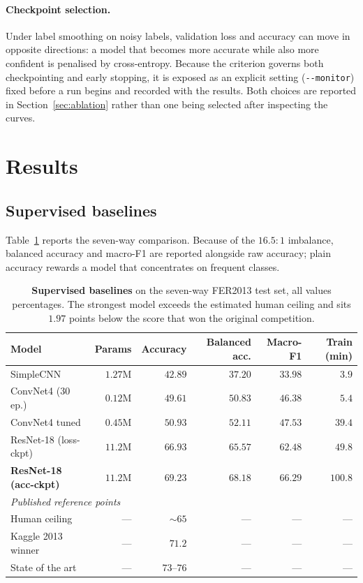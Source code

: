 \documentclass[11pt,a4paper]{article}
\begin{document}
\paragraph{Checkpoint selection.}
Under label smoothing on noisy labels, validation loss and accuracy can move in
opposite directions: a model that becomes more accurate while also more
confident is penalised by cross-entropy. Because the criterion governs both
checkpointing and early stopping, it is exposed as an explicit setting
(\texttt{-{}-monitor}) fixed before a run begins and recorded with the results.
Both choices are reported in Section~\ref{sec:ablation} rather than one being
selected after inspecting the curves.

\section{Results}
\label{sec:results}

\subsection{Supervised baselines}
Table~\ref{tab:baselines} reports the seven-way comparison. Because of the
$16.5{:}1$ imbalance, balanced accuracy and macro-F1 are reported alongside raw
accuracy; plain accuracy rewards a model that concentrates on frequent classes.

\begin{table}[htbp]
\centering
\small
\begin{tabular}{lrrrrr}
\toprule
Model & Params & Accuracy & Balanced acc. & Macro-F1 & Train (min) \\
\midrule
SimpleCNN                     & $1.27$M & $42.89$ & $37.20$ & $33.98$ & $3.9$ \\
ConvNet4 ($30$ ep.)           & $0.12$M & $49.61$ & $50.83$ & $46.38$ & $5.4$ \\
ConvNet4 tuned                & $0.45$M & $50.93$ & $52.11$ & $47.53$ & $39.4$ \\
ResNet-18 (loss-ckpt)         & $11.2$M & $66.93$ & $65.57$ & $62.48$ & $49.8$ \\
\textbf{ResNet-18 (acc-ckpt)} & $11.2$M & $\mathbf{69.23}$ & $\mathbf{68.18}$ & $\mathbf{66.29}$ & $100.8$ \\
\midrule
\multicolumn{6}{l}{\emph{Published reference points}} \\
Human ceiling~\cite{goodfellow2013challenges} & --- & ${\sim}65$ & --- & --- & --- \\
Kaggle 2013 winner~\cite{tang2013deep}        & --- & $71.2$     & --- & --- & --- \\
State of the art~\cite{khaireddin2021facial}  & --- & $73$--$76$ & --- & --- & --- \\
\bottomrule
\end{tabular}
\caption{\textbf{Supervised baselines} on the seven-way FER2013 test set, all
values percentages. The strongest model exceeds the estimated human ceiling and
sits $1.97$ points below the score that won the original competition.}
\label{tab:baselines}
\end{table}
\end{document}
